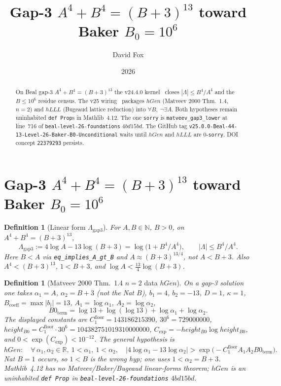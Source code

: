 \documentclass[11pt]{amsart}
\title{Gap-3 $A^4+B^4=(B+3)^{13}$ toward Baker $B_0=10^6$}
\author{David Fox}
\date{2026}
\newtheorem{definition}[theorem]{Definition}
\begin{document}
\maketitle

\begin{abstract}
On Beal gap-3 $A^4+B^4=(B+3)^{13}$ the v24.4.0 kernel~\cite{beal_level26_v24_4_0}
closes $|\Lambda|\le B^4/A^4$ and the $B\le 10^6$ residue census.
The v25 wiring~\cite{beal_level26_v25_0_0} packages
$hGen$ (Matveev 2000 Thm.~1.4, $n=2$) and $hLLL$ (Bugeaud lattice reduction)
into $\forall B,\ \neg\exists A$. Both hypotheses remain uninhabited
\texttt{def Prop}s in Mathlib~4.12. The one \texttt{sorry} is
\texttt{matveev\_gap3\_lower} at line~716 of
\texttt{beal-level-26-foundations} $4bd15bd$.
The GitHub tag
\texttt{v25.0.0-Beal-44-13-Level-26-Baker-B0-Unconditional}
waits until $hGen$ and $hLLL$ are $0$-\texttt{sorry}.
DOI concept \texttt{22379293} persists.
\end{abstract}

\section{Gap-3 $A^4+B^4=(B+3)^{13}$ toward Baker $B_0=10^6$}

\begin{definition}[Linear form $\Lambda_{\mathrm{gap3}}$]
For $A,B\in\mathbb{N}$, $B>0$, on $A^4+B^4=(B+3)^{13}$,
\[
\Lambda_{\mathrm{gap3}} := 4\log A - 13\log(B+3)
= \log\bigl(1+B^4/A^4\bigr),
\qquad |\Lambda|\le B^4/A^4.
\]
Here $B<A$ via \texttt{eq\_implies\_A\_gt\_B} and
$A\approx(B+3)^{13/4}$, not $A<B+3$. Also $A^4<(B+3)^{13}$,
$1<B+3$, and $\log A < \tfrac{13}{4}\log(B+3)$.
\end{definition}

\begin{definition}[Matveev 2000 Thm.~1.4 $n=2$ data $hGen$]
On a gap-3 solution one takes $\alpha_1=A$, $\alpha_2=B+3$
(not the Nat $B$), $b_1=4$, $b_2=-13$, $D=1$, $\kappa=1$,
$B_{\mathrm{coeff}}=\max|b_i|=13$,
$A_1=\log\alpha_1$, $A_2=\log\alpha_2$,
\[
B0_{\mathrm{term}}
= \log 13 + \log(\log 13) + \log\alpha_1 + \log\alpha_2.
\]
The displayed constants are
$C_1^{\mathrm{floor}}=143186215390$, $30^6=729000000$,
$height_{B0}=C_1^{\mathrm{floor}}\cdot 30^6=104382751019310000000$,
$C_{\mathrm{exp}}= -height_{B0}\log height_{B0}$, and
$0<\exp(C_{\mathrm{exp}})<10^{-12}$.
The general hypothesis is
\[
hGen:\quad
\forall\,\alpha_1,\alpha_2\in\mathbb{R},\
1<\alpha_1,\ 1<\alpha_2,\quad
\bigl|4\log\alpha_1-13\log\alpha_2\bigr|
> \exp\bigl(-C_1^{\mathrm{floor}} A_1 A_2 B0_{\mathrm{term}}\bigr).
\]
Nat $B=1$ occurs, so $1<B$ is the wrong hyp; one uses $1<\alpha_2=B+3$.
Mathlib~4.12 has no Matveev/Baker/Bugeaud linear-forms theorem;
$hGen$ is an uninhabited \texttt{def Prop} in
\texttt{beal-level-26-foundations} $4bd15bd$.
\end{definition}
\end{document}
